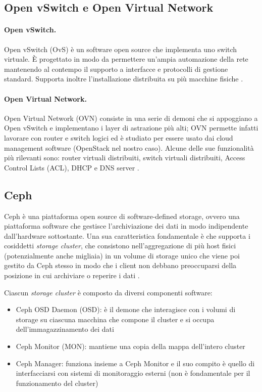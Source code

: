 \subsection{Open vSwitch e Open Virtual Network}
\label{subsubsec:ovs} 

\paragraph{Open vSwitch.}Open vSwitch (OvS) è un software open source che implementa uno switch virtuale. È progettato in modo da permettere un'ampia automazione della rete mantenendo al contempo il supporto a interfacce e protocolli di gestione standard. Supporta inoltre l'installazione distribuita su più macchine fisiche \cite{ovs_home}.

\paragraph{Open Virtual Network.} Open Virtual Network (OVN) consiste in una serie di demoni che si appoggiano a Open vSwitch e implementano i layer di astrazione più alti; OVN permette infatti lavorare con router e switch logici ed è studiato per essere usato dai cloud management software (OpenStack nel nostro caso). Alcune delle sue funzionalità più rilevanti sono: router virtuali distribuiti, switch virtuali distribuiti, Access Control Lists (ACL), DHCP e DNS server \cite{ovn_home}.

\subsection{Ceph}\label{sec:ceph}
Ceph è una piattaforma open source di software-defined storage, ovvero una piattaforma software che gestisce l'archiviazione dei dati in modo indipendente dall'hardware sottostante. Una sua caratteristica fondamentale è che supporta i cosiddetti \textit{storage cluster}, che consistono nell'aggregazione di più host fisici (potenzialmente anche migliaia) in un volume di storage unico che viene poi gestito da Ceph stesso in modo che i client non debbano preoccuparsi della posizione in cui archiviare o reperire i dati \cite{ceph_documentation}.

Ciascun \textit{storage cluster} è composto da diversi componenti software:
\begin{itemize}
    \item Ceph OSD Daemon (OSD): è il demone che interagisce con i volumi di storage su ciascuna macchina che compone il cluster e si occupa dell'immagazzinamento dei dati
    \item Ceph Monitor (MON): mantiene una copia della mappa dell'intero cluster
    \item Ceph Manager: funziona insieme a Ceph Monitor e il suo compito è quello di interfacciarsi con sistemi di monitoraggio esterni (non è fondamentale per il funzionamento del cluster)
\end{itemize}

